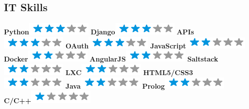\documentclass[]{friggeri-cv}
\begin{document}
\begin{aside}
  \section{IT Skills}
    \textbf{Python}\includegraphics[scale=0.40]{img/3stars.png}
    \textbf{Django}\includegraphics[scale=0.40]{img/3stars.png}
    \textbf{APIs}\includegraphics[scale=0.40]{img/3stars.png}
    \textbf{OAuth}\includegraphics[scale=0.40]{img/3stars.png}
    \textbf{JavaScript}\includegraphics[scale=0.40]{img/2stars.png}
    \textbf{Docker}\includegraphics[scale=0.40]{img/2stars.png}
    \textbf{AngularJS}\includegraphics[scale=0.40]{img/2stars.png}
    \textbf{Saltstack}\includegraphics[scale=0.40]{img/2stars.png}
    \textbf{LXC}\includegraphics[scale=0.40]{img/2stars.png}
    \textbf{HTML5/CSS3}\includegraphics[scale=0.40]{img/2stars.png}
    \textbf{Java}\includegraphics[scale=0.40]{img/2stars.png}
    \textbf{Prolog}\includegraphics[scale=0.40]{img/2stars.png}
    \textbf{C/C++}\includegraphics[scale=0.40]{img/1stars.png}

\end{aside}
\end{document}
